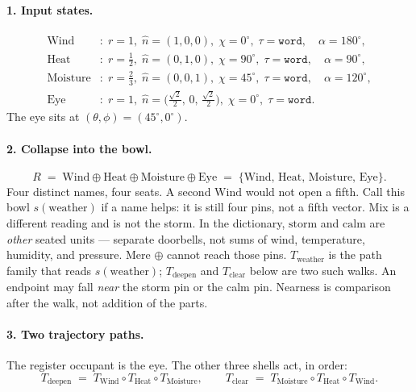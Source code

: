 \documentclass[12pt, a4paper]{article}
\begin{document}
\paragraph{1. Input states.}
\begin{align*}
\mathrm{Wind}&:
  \; r=1,\;
  \hat n=(1,0,0),\;
  \chi=0^\circ,\;
  \tau=\mathtt{word},
  \quad \alpha=180^\circ,\\
\mathrm{Heat}&:
  \; r=\tfrac12,\;
  \hat n=(0,1,0),\;
  \chi=90^\circ,\;
  \tau=\mathtt{word},
  \quad \alpha=90^\circ,\\
\mathrm{Moisture}&:
  \; r=\tfrac23,\;
  \hat n=(0,0,1),\;
  \chi=45^\circ,\;
  \tau=\mathtt{word},
  \quad \alpha=120^\circ,\\
\mathrm{Eye}&:
  \; r=1,\;
  \hat n=\bigl(\tfrac{\sqrt{2}}{2},\,0,\,\tfrac{\sqrt{2}}{2}\bigr),\;
  \chi=0^\circ,\;
  \tau=\mathtt{word}.
\end{align*}
The eye sits at $(\theta,\phi)=(45^\circ,0^\circ)$.

\paragraph{2. Collapse into the bowl.}
\begin{equation}
    R
    \;=\;
    \mathrm{Wind}\oplus\mathrm{Heat}\oplus\mathrm{Moisture}\oplus\mathrm{Eye}
    \;=\;
    \{\mathrm{Wind},\,\mathrm{Heat},\,\mathrm{Moisture},\,\mathrm{Eye}\}.
    \label{eq:storm_bowl}
\end{equation}
Four distinct names, four seats. A second $\mathrm{Wind}$ would not
open a fifth. Call this bowl $s(\mathrm{weather})$ if a name helps:
it is still four pins, not a fifth vector. Mix is a different
reading and is not the storm.
In the dictionary, $\mathrm{storm}$ and $\mathrm{calm}$ are
\emph{other} seated units --- separate doorbells, not sums of
wind, temperature, humidity, and pressure. Mere $\oplus$ cannot
reach those pins. $T_{\mathrm{weather}}$ is the path family that
reads $s(\mathrm{weather})$; $T_{\mathrm{deepen}}$ and
$T_{\mathrm{clear}}$ below are two such walks. An endpoint may
fall \emph{near} the storm pin or the calm pin. Nearness is
comparison after the walk, not addition of the parts.

\paragraph{3. Two trajectory paths.}
The register occupant is the eye. The other three shells act, in order:
\begin{equation}
    T_{\mathrm{deepen}}
    \;=\;
    T_{\mathrm{Wind}}\circ T_{\mathrm{Heat}}\circ T_{\mathrm{Moisture}},
    \qquad
    T_{\mathrm{clear}}
    \;=\;
    T_{\mathrm{Moisture}}\circ T_{\mathrm{Heat}}\circ T_{\mathrm{Wind}}.
\end{equation}
\end{document}

